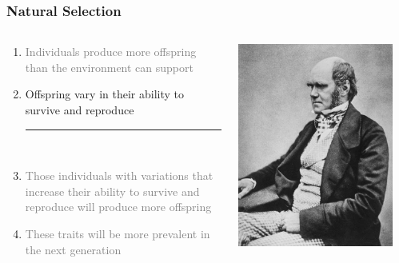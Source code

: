\documentclass[10pt]{beamer}
\begin{document}
\begin{frame}[t]
\frametitle{Natural Selection}
\vspace{0.5cm}

	\begin{columns}
		\begin{column}{0.7\textwidth}
			\begin{enumerate}
				\item \textcolor{gray}{Individuals produce more offspring than the environment can support}
				\medskip
				\item Offspring vary in their ability to survive and reproduce
				\begin{center}
					\rule{0.5\textwidth}{0.5pt}\\
				\end{center}
				\smallskip
				\item \textcolor{gray}{Those individuals with variations that increase their ability to survive and reproduce will produce more offspring}
				\medskip
				\item \textcolor{gray}{These traits will be more prevalent in the next generation}
			\end{enumerate}
		\end{column}
		
		\begin{column}{0.3\textwidth}
			\begin{center}
				\includegraphics[width=0.9\textwidth]{figures/Darwin.jpg}
			\end{center}
		\end{column}
	\end{columns}
\end{frame}
\end{document}
